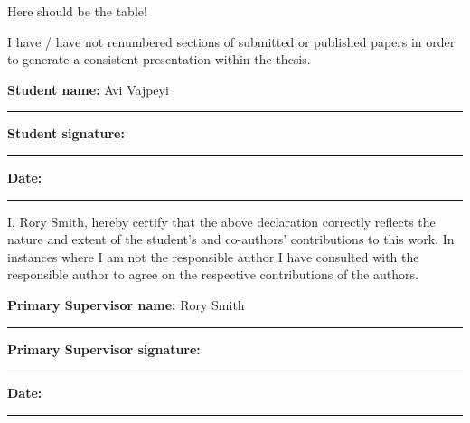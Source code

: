 {Here should be the table!

I have / have not renumbered sections of submitted or published papers
in order to generate a consistent presentation within the thesis.

\textbf{Student name:} Avi Vajpeyi
\rule[1em]{25em}{0.5pt}

\textbf{Student signature:}
\rule[1em]{25em}{0.5pt}

\textbf{Date:}
\rule[1em]{25em}{0.5pt}

I, Rory Smith, hereby certify that the above declaration correctly reflects the
nature and extent of the student's and co-authors' contributions to this
work.
In instances where I am not the responsible author I have
consulted with the responsible author to agree on the respective
contributions of the authors.

\textbf{Primary Supervisor name:} Rory Smith
\rule[1em]{25em}{0.5pt}  %

\textbf{Primary Supervisor signature:}
\rule[1em]{25em}{0.5pt}  %

\textbf{Date:}
\rule[1em]{25em}{0.5pt}  %















}
